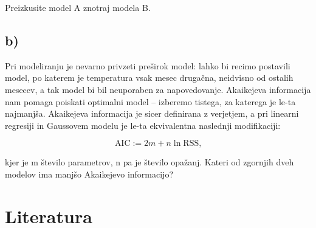 \documentclass[12pt, a4paper]{article}
\begin{document}
Preizkusite model A znotraj modela B.

\subsection{b)}
Pri modeliranju je nevarno privzeti preširok model: lahko bi recimo postavili
model, po katerem je temperatura vsak mesec drugačna, neidvisno od ostalih
mesecev, a tak model bi bil neuporaben za napovedovanje. Akaikejeva 
informacija nam pomaga poiskati optimalni model – izberemo tistega, za katerega
je le-ta najmanjša. Akaikejeva informacija je sicer definirana z verjetjem, 
a pri linearni regresiji in Gaussovem modelu je le-ta ekvivalentna naslednji 
modifikaciji:

\[
    \text{AIC} := 2m + n \ln \text{RSS,}
    \]

kjer je m število parametrov, n pa je število opažanj. Kateri od zgornjih dveh
modelov ima manjšo Akaikejevo informacijo?



\section{Literatura}
\end{document}
